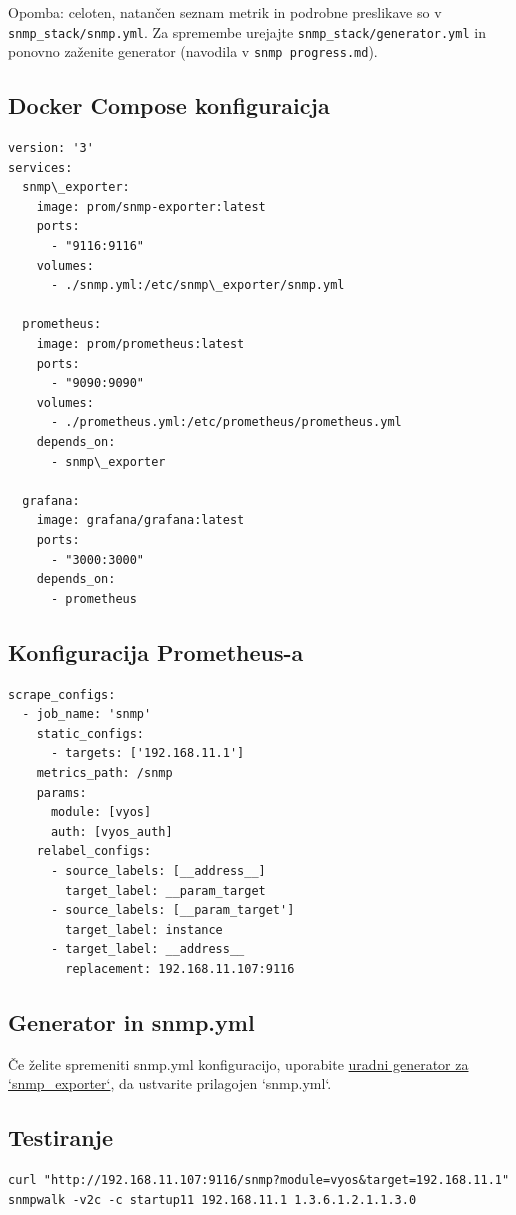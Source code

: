 \documentclass[a4paper,11pt]{article}
\begin{document}
Opomba: celoten, natančen seznam metrik in podrobne preslikave so v \texttt{snmp\_stack/snmp.yml}. Za spremembe urejajte \texttt{snmp\_stack/generator.yml} in ponovno zaženite generator (navodila v \texttt{snmp progress.md}).

\subsection{Docker Compose konfiguraicja}
\begin{lstlisting}
version: '3'
services:
  snmp\_exporter:
    image: prom/snmp-exporter:latest
    ports:
      - "9116:9116"
    volumes:
      - ./snmp.yml:/etc/snmp\_exporter/snmp.yml

  prometheus:
    image: prom/prometheus:latest
    ports:
      - "9090:9090"
    volumes:
      - ./prometheus.yml:/etc/prometheus/prometheus.yml
    depends_on:
      - snmp\_exporter

  grafana:
    image: grafana/grafana:latest
    ports:
      - "3000:3000"
    depends_on:
      - prometheus
\end{lstlisting}

\subsection{Konfiguracija Prometheus-a}
\begin{lstlisting}
scrape_configs:
  - job_name: 'snmp'
    static_configs:
      - targets: ['192.168.11.1']
    metrics_path: /snmp
    params:
      module: [vyos]
      auth: [vyos_auth]
    relabel_configs:
      - source_labels: [__address__]
        target_label: __param_target
      - source_labels: [__param_target']
        target_label: instance
      - target_label: __address__
        replacement: 192.168.11.107:9116
\end{lstlisting}

\subsection{Generator in snmp.yml}
Če želite spremeniti snmp.yml konfiguracijo, uporabite \href{https://github.com/prometheus/snmp_exporter/tree/main/generator}{uradni generator za `snmp\_exporter`}, 
da ustvarite prilagojen `snmp.yml`.

\subsection{Testiranje}
\begin{lstlisting}
curl "http://192.168.11.107:9116/snmp?module=vyos&target=192.168.11.1"
snmpwalk -v2c -c startup11 192.168.11.1 1.3.6.1.2.1.1.3.0
\end{lstlisting}
\end{document}
